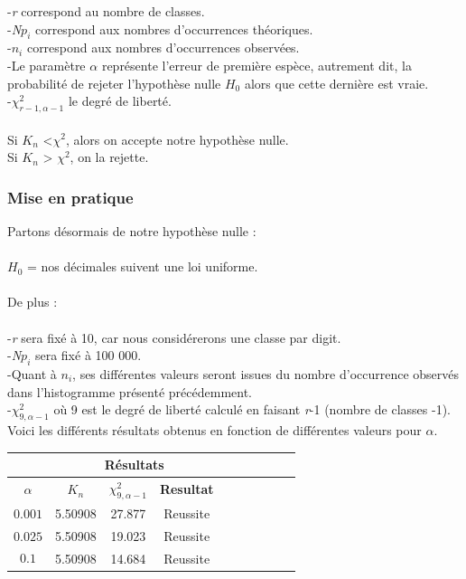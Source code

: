 \documentclass[french]{article}
\begin{document}
   -\textit{r} correspond au nombre de classes. 
   \\
   -\textit{N$p_{i}$} correspond aux nombres d'occurrences théoriques. 
   \\
   -\textit{$n_{i}$} correspond aux nombres d'occurrences observées.
   \\
   -Le paramètre \textit{$\alpha$} représente l'erreur de première espèce, autrement dit, la probabilité de rejeter l'hypothèse nulle \textit{$H_{0}$} alors que cette dernière est vraie.
   \\
   -$\chi^{2}_{\textit{r}-1,\alpha-1}$ le degré de liberté.
\\
\\
Si \textit{$K_{n}$} <$\chi^{2}$, alors on accepte notre hypothèse nulle.
\\
Si \textit{$K_{n}$} > $\chi^{2}$, on la rejette.
\\
\subsubsection{Mise en pratique}
Partons désormais de notre hypothèse nulle :
\\
\\
       $H_{0}$ = {nos décimales suivent une loi uniforme}.
\\
\\
De plus : 
\\
\\
     -\textit{r} sera fixé à 10, car nous considérerons une classe par digit.
     \\
     -\textit{N$p_{i}$} sera fixé à 100 000.
     \\ 
     -Quant à \textit{$n_{i}$}, ses différentes valeurs seront issues du nombre d'occurrence observés dans l'histogramme présenté précédemment.
     \\
     -$\chi^{2}_{9,\alpha-1}$ où 9 est le degré de liberté calculé en faisant \textit{r}-1 (nombre de classes -1).
\\

Voici les différents résultats obtenus en fonction de différentes valeurs pour $\alpha$.
\\
\begin{longtable}{|c|c|c|c|c|c|c|c|c|c|}
	\hline
	& \multicolumn{3}{c|}{\textbf{Résultats}} \\ 
	\hline 
	\textbf{$\alpha$}  & $K_{n}$ & $\chi^{2}_{9,\alpha-1}$ & \textbf{Resultat} \\ 
	\hline 
	$$0.001$$ & 5.50908 & 27.877 & Reussite\\ 
	\hline 
	$$0.025$$ & 5.50908 & 19.023 & Reussite\\ 
	\hline 
	$$0.1$$ & 5.50908 & 14.684 & Reussite \\ 
	\hline 
\end{longtable}
\end{document}
